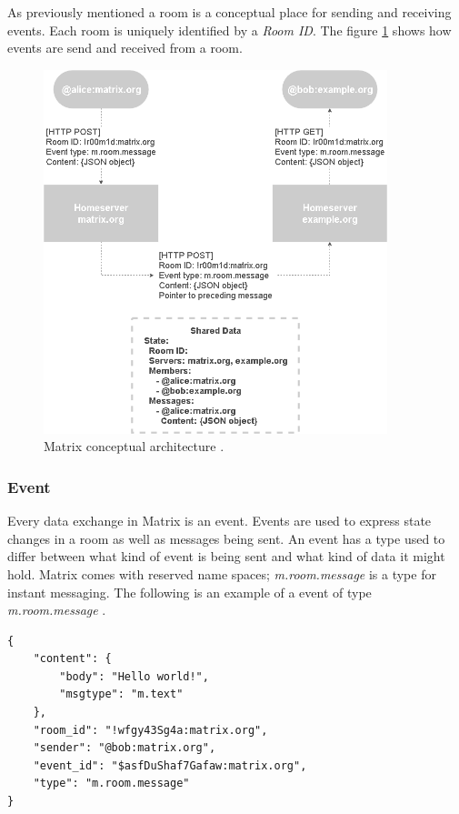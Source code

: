 As previously mentioned a room is a conceptual place for sending and receiving events. Each room is uniquely identified by a \emph{Room ID}. The figure \ref{fig:matrix_room} shows how events are send and received from a room.



\begin{figure}[H]
	\centering
	\includegraphics[width=10cm]{figures/matrix_room.png}
	\caption{ Matrix conceptual architecture \cite{matrixspec}.}
	\label{fig:matrix_room}
\end{figure}

\subsubsection{Event}

Every data exchange in Matrix is an event. Events are used to express state changes in a room as well as messages being sent. An event has a type used to differ between what kind of event is being sent and what kind of data it might hold. Matrix comes with reserved name spaces; \emph{m.room.message} is a type for instant messaging. The following is an example of a event of type \emph{m.room.message} \cite{matrixspec}.


\begin{lstlisting}
{
	"content": {
		"body": "Hello world!",
		"msgtype": "m.text"
	},
	"room_id": "!wfgy43Sg4a:matrix.org",
	"sender": "@bob:matrix.org",
	"event_id": "$asfDuShaf7Gafaw:matrix.org",
	"type": "m.room.message"
}
\end{lstlisting}


